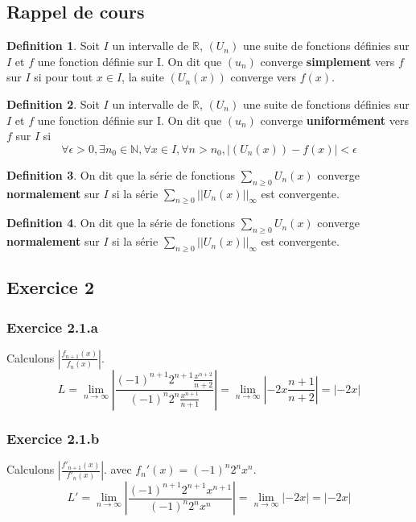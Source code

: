 \documentclass[]{book}
\theoremstyle{definition}
\newtheorem{defn}{Definition}
\newcommand{\bb}[1]{\mathbb{#1}}
\newcommand{\R}{\bb{R}}
\newcommand{\N}{\bb{N}}
\begin{document}
\subsection*{Rappel de cours}
\begin{defn}
Soit $I$ un intervalle de $\R$,  $(U_n)$ une suite de fonctions d\'efinies sur $I$ et $f$ une fonction d\'efinie sur I.
On dit que $(u_n)$ converge \textbf{simplement} vers $f$ sur $I$ si pour tout $x \in I$, la suite $(U_n(x))$ converge vers $f(x)$.
\end{defn}

\begin{defn}
Soit $I$ un intervalle de $\R$,  $(U_n)$ une suite de fonctions d\'efinies sur $I$ et $f$ une fonction d\'efinie sur I.
On dit que $(u_n)$ converge \textbf{uniform\'ement} vers $f$ sur $I$ si
$$\forall \epsilon > 0, \exists n_0 \in \N, \forall x \in I, \forall n > n_0, |(U_n(x)) - f(x)| < \epsilon$$
\end{defn}

\begin{defn}
On dit que la s\'erie de fonctions $\sum_{n\geq0}U_n(x)$ converge \textbf{normalement} sur  $I$ si la s\'erie $\sum_{n\geq0}||U_n(x)||_{\infty}$ est convergente.
 \end{defn}

\begin{defn}
On dit que la s\'erie de fonctions $\sum_{n\geq0}U_n(x)$ converge \textbf{normalement} sur  $I$ si la s\'erie $\sum_{n\geq0}||U_n(x)||_{\infty}$ est convergente.
\end{defn}


\newpage
\subsection*{Exercice 2}
\subsubsection*{Exercice 2.1.a}
Calculons $\left\lvert \frac{f_{n+1}(x)}{f_n(x)} \right\rvert$.
$$
L = \lim_{n \to \infty}\left\lvert \frac{(-1)^{n+1}2^{n+1}\frac{x^{n+2}}{n+2}}{(-1)^{n}2^{n}\frac{x^{n+1}}{n+1}} \right\rvert = \lim_{n \to \infty} \left\lvert -2x\frac{n+1}{n+2}  \right\rvert = \lvert -2x \rvert
$$

\subsubsection*{Exercice 2.1.b}
Calculons $\left\lvert \frac{f'_{n+1}(x)}{f'_n(x)} \right\rvert$. avec $f_{n}'(x) = (-1)^n2^nx^n$.
$$
L' = \lim_{n \to \infty}\left\lvert \frac{(-1)^{n+1}2^{n+1}x^{n+1}}{(-1)^{n}2^{n}x^{n}} \right\rvert = \lim_{n \to \infty} \left\lvert -2x \right\rvert = \lvert -2x \rvert
$$
\end{document}

